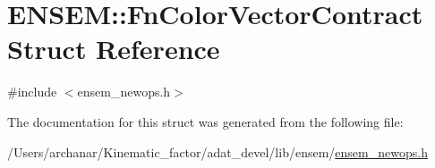 \hypertarget{structENSEM_1_1FnColorVectorContract}{}\section{E\+N\+S\+EM\+:\+:Fn\+Color\+Vector\+Contract Struct Reference}
\label{structENSEM_1_1FnColorVectorContract}


{\ttfamily \#include $<$ensem\+\_\+newops.\+h$>$}



The documentation for this struct was generated from the following file\+:\begin{DoxyCompactItemize}
\item 
/\+Users/archanar/\+Kinematic\+\_\+factor/adat\+\_\+devel/lib/ensem/\mbox{\hyperlink{lib_2ensem_2ensem__newops_8h}{ensem\+\_\+newops.\+h}}\end{DoxyCompactItemize}
